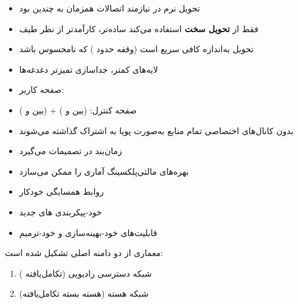 
\begin{itemize}
\tightlist
\item
  تحویل نرم در  نیازمند اتصالات همزمان به چندین  بود
\item
   فقط از \textbf{تحویل سخت} استفاده می‌کند  ساده‌تر، کارآمدتر از نظر طیف
\item
  تحویل به‌اندازه کافی سریع است (وقفه حدود ) که نامحسوس باشد
\end{itemize}


\begin{itemize}
\tightlist
\item
  لایه‌های کمتر، جداسازی تمیزتر دغدغه‌ها
\item
  صفحه کاربر: 
\item
  صفحه کنترل:  (بین  و ) +  (بین  و )
\end{itemize}


\begin{itemize}
\tightlist
\item
  بدون کانال‌های اختصاصی  تمام منابع به‌صورت پویا به اشتراک گذاشته می‌شوند
\item
  زمان‌بند در  تصمیمات  می‌گیرد
\item
  بهره‌های مالتی‌پلکسینگ آماری را ممکن می‌سازد
\end{itemize}


\begin{itemize}
\tightlist
\item
  روابط همسایگی خودکار 
\item
  خود-پیکربندی های جدید
\item
  قابلیت‌های خود-بهینه‌سازی و خود-ترمیم
\end{itemize}


معماری  از دو دامنه اصلی تشکیل شده است:

\begin{enumerate}
\def\labelenumi{\arabic{enumi}.}
\tightlist
\item
   ( تکامل‌یافته)  شبکه دسترسی رادیویی
\item
   (هسته بسته تکامل‌یافته)  شبکه هسته
\end{enumerate}

